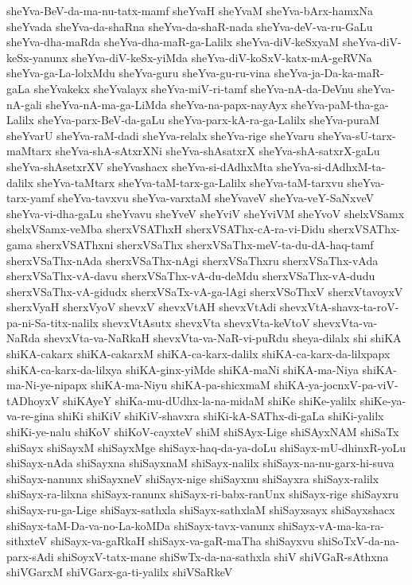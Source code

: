 {sheYva-BeV-da-ma-nu-tatx-mamf
sheYvaH
sheYvaM
sheYva-bArx-hamxNa
sheYvada
sheYva-da-shaRna
sheYva-da-shaR-nada
sheYva-deV-va-ru-GaLu
sheYva-dha-maRda
sheYva-dha-maR-ga-Lalilx
sheYva-diV-keSxyaM
sheYva-diV-keSx-yanunx
sheYva-diV-keSx-yiMda
sheYva-diV-koSxV-katx-mA-geRVNa
sheYva-ga-La-lolxMdu
sheYva-guru
sheYva-gu-ru-vina
sheYva-ja-Da-ka-maR-gaLa
sheYvakekx
sheYvalayx
sheYva-miV-ri-tamf
sheYva-nA-da-DeVnu
sheYva-nA-gali
sheYva-nA-ma-ga-LiMda
sheYva-na-papx-nayAyx
sheYva-paM-tha-ga-Lalilx
sheYva-parx-BeV-da-gaLu
sheYva-parx-kA-ra-ga-Lalilx
sheYva-puraM
sheYvarU
sheYva-raM-dadi
sheYva-relalx
sheYva-rige
sheYvaru
sheYva-sU-tarx-maMtarx
sheYva-shA-sAtxrXNi
sheYva-shAsatxrX
sheYva-shA-satxrX-gaLu
sheYva-shAsetxrXV
sheYvashacx
sheYva-si-dAdhxMta
sheYva-si-dAdhxM-ta-dalilx
sheYva-taMtarx
sheYva-taM-tarx-ga-Lalilx
sheYva-taM-tarxvu
sheYva-tarx-yamf
sheYva-tavxvu
sheYva-varxtaM
sheYvaveV
sheYva-veY-SaNxveV
sheYva-vi-dha-gaLu
sheYvavu
sheYveV
sheYviV
sheYviVM
sheYvoV
shelxVSamx
shelxVSamx-veMba
sherxVSAThxH
sherxVSAThx-cA-ra-vi-Didu
sherxVSAThx-gama
sherxVSAThxni
sherxVSaThx
sherxVSaThx-meV-ta-du-dA-haq-tamf
sherxVSaThx-nAda
sherxVSaThx-nAgi
sherxVSaThxru
sherxVSaThx-vAda
sherxVSaThx-vA-davu
sherxVSaThx-vA-du-deMdu
sherxVSaThx-vA-dudu
sherxVSaThx-vA-gidudx
sherxVSaTx-vA-ga-lAgi
sherxVSoThxV
sherxVtavoyxV
sherxVyaH
sherxVyoV
shevxV
shevxVtAH
shevxVtAdi
shevxVtA-shavx-ta-roV-pa-ni-Sa-titx-nalilx
shevxVtAsutx
shevxVta
shevxVta-keVtoV
shevxVta-va-NaRda
shevxVta-va-NaRkaH
shevxVta-va-NaR-vi-puRdu
sheya-dilalx
shi
shiKA
shiKA-cakarx
shiKA-cakarxM
shiKA-ca-karx-dalilx
shiKA-ca-karx-da-lilxpapx
shiKA-ca-karx-da-lilxya
shiKA-ginx-yiMde
shiKA-maNi
shiKA-ma-Niya
shiKA-ma-Ni-ye-nipapx
shiKA-ma-Niyu
shiKA-pa-shicxmaM
shiKA-ya-jocnxV-pa-viV-tADhoyxV
shiKAyeY
shiKa-mu-dUdhx-la-na-midaM
shiKe
shiKe-yalilx
shiKe-ya-va-re-gina
shiKi
shiKiV
shiKiV-shavxra
shiKi-kA-SAThx-di-gaLa
shiKi-yalilx
shiKi-ye-nalu
shiKoV
shiKoV-cayxteV
shiM
shiSAyx-Lige
shiSAyxNAM
shiSaTx
shiSayx
shiSayxM
shiSayxMge
shiSayx-haq-da-ya-doLu
shiSayx-mU-dhinxR-yoLu
shiSayx-nAda
shiSayxna
shiSayxnaM
shiSayx-nalilx
shiSayx-na-nu-garx-hi-suva
shiSayx-nanunx
shiSayxneV
shiSayx-nige
shiSayxnu
shiSayxra
shiSayx-ralilx
shiSayx-ra-lilxna
shiSayx-ranunx
shiSayx-ri-babx-ranUnx
shiSayx-rige
shiSayxru
shiSayx-ru-ga-Lige
shiSayx-sathxla
shiSayx-sathxlaM
shiSayxsayx
shiSayxshacx
shiSayx-taM-Da-va-no-La-koMDa
shiSayx-tavx-vanunx
shiSayx-vA-ma-ka-ra-sithxteV
shiSayx-va-gaRkaH
shiSayx-va-gaR-maTha
shiSayxvu
shiSoTxV-da-na-parx-sAdi
shiSoyxV-tatx-mane
shiSwTx-da-na-sathxla
shiV
shiVGaR-sAthxna
shiVGarxM
shiVGarx-ga-ti-yalilx
shiVSaRkeV
}
